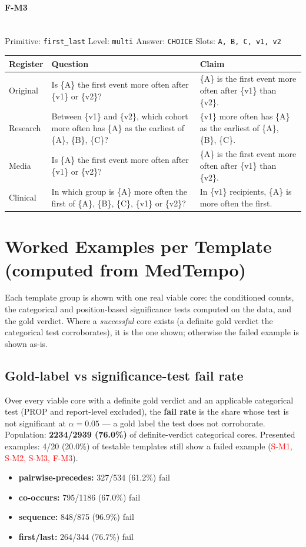 \documentclass[11pt]{article}
\begin{document}
\paragraph{\textbf{F-M3}}\mbox{}\\
Primitive: \texttt{first\_last} \quad Level: \texttt{multi} \quad Answer: \texttt{CHOICE} \quad Slots: \texttt{A, B, C, v1, v2}\\[2pt]
\begin{tabularx}{\linewidth}{@{}l L L@{}}
\toprule
\textbf{Register} & \textbf{Question} & \textbf{Claim} \\
\midrule
Original & Is \{A\} the first event more often after \{v1\} or \{v2\}? & \{A\} is the first event more often after \{v1\} than \{v2\}. \\
Research & Between \{v1\} and \{v2\}, which cohort more often has \{A\} as the earliest of \{A\}, \{B\}, \{C\}? & \{v1\} more often has \{A\} as the earliest of \{A\}, \{B\}, \{C\}. \\
Media & Is \{A\} the first event more often after \{v1\} or \{v2\}? & \{A\} is the first event more often after \{v1\} than \{v2\}. \\
Clinical & In which group is \{A\} more often the first of \{A\}, \{B\}, \{C\}, \{v1\} or \{v2\}? & In \{v1\} recipients, \{A\} is more often the first. \\
\bottomrule
\end{tabularx}
\vspace{4pt}

\section{Worked Examples per Template (computed from MedTempo)}
Each template group is shown with one real viable core: the conditioned counts, the categorical and position-based significance tests computed on the data, and the gold verdict. Where a \emph{successful} core exists (a definite gold verdict the categorical test corroborates), it is the one shown; otherwise the failed example is shown as-is.

\subsection*{Gold-label vs significance-test fail rate}
Over every viable core with a definite gold verdict and an applicable categorical test (PROP and report-level excluded), the \textbf{fail rate} is the share whose test is not significant at $\alpha=0.05$ --- a gold label the test does not corroborate. Population: \textbf{2234/2939 (76.0\%)} of definite-verdict categorical cores. Presented examples: 4/20 (20.0\%) of testable templates still show a failed example (\textcolor{red}{S-M1, S-M2, S-M3, F-M3}).
\begin{itemize}
\item \textbf{pairwise-precedes:} 327/534 (61.2\%) fail
\item \textbf{co-occurs:} 795/1186 (67.0\%) fail
\item \textbf{sequence:} 848/875 (96.9\%) fail
\item \textbf{first/last:} 264/344 (76.7\%) fail
\end{itemize}
\end{document}
